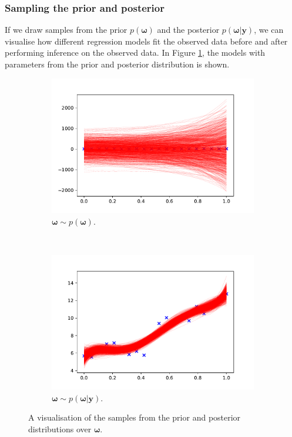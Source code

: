 \documentclass{article}
\begin{document}
\subsubsection{Sampling the prior and posterior}
If we draw samples from the prior $p(\boldsymbol\omega)$ and the posterior $p(\boldsymbol\omega \vert \mathbf{y})$, we can visualise how different regression models fit the observed data before and after performing inference on the observed data. In Figure \ref{fig:Q2_sample_posterior}, the models with parameters from the prior and posterior distribution is shown.
\begin{figure}[htb!]
     \centering
     \begin{subfigure}[b]{0.45\textwidth}
         \centering
         \includegraphics[width=\textwidth]{Q2_2.pdf}
         \caption{$\boldsymbol\omega \sim p(\boldsymbol\omega)$.}
     \end{subfigure}
     ~
     \begin{subfigure}[b]{0.45\textwidth}
         \centering
         \includegraphics[width=\textwidth]{Q2_3.pdf}
         \caption{$\boldsymbol\omega \sim p(\boldsymbol\omega \vert \mathbf{y})$.}
     \end{subfigure}
     
     \caption{A visualisation of the samples from the prior and posterior distributions over $\boldsymbol\omega$.}
     \label{fig:Q2_sample_posterior}
\end{figure}
\end{document}
